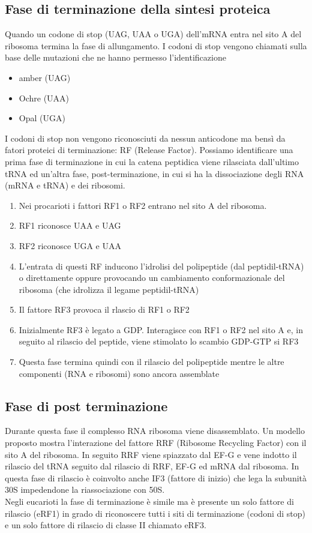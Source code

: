 \documentclass{article}
\begin{document}
\subsection{Fase di terminazione della sintesi proteica}
Quando un codone di stop (UAG, UAA o UGA) dell'mRNA entra nel sito A del ribosoma termina la fase di allungamento.
I codoni di stop vengono chiamati sulla base delle mutazioni che ne hanno permesso l'identificazione
\begin{itemize}
    \item amber (UAG)
    \item Ochre (UAA)
    \item Opal (UGA)
\end{itemize}
I codoni di stop non vengono riconosciuti da nessun anticodone ma bensì da fatori proteici di terminazione: RF (Release Factor).
Possiamo identificare una prima fase di terminazione in cui la catena peptidica viene rilasciata dall'ultimo tRNA ed
un'altra fase, post-terminazione, in cui si ha la dissociazione degli RNA (mRNA e tRNA) e dei ribosomi.
\begin{enumerate}
    \item Nei procarioti i fattori RF1 o RF2 entrano nel sito A del
    ribosoma.
    \item RF1 riconosce UAA e UAG
    \item RF2 riconosce UGA e UAA
    \item L'entrata di questi RF inducono l'idrolisi del polipeptide (dal
    peptidil-tRNA) o direttamente oppure provocando un
    cambiamento conformazionale del ribosoma (che idrolizza
    il legame peptidil-tRNA)
    \item Il fattore RF3 provoca il rlascio di RF1 o RF2
    \item Inizialmente RF3 è legato a GDP. Interagisce con RF1 o RF2 nel sito A e, in seguito al
    rilascio del peptide, viene stimolato lo scambio
    GDP-GTP si RF3
    \item Questa fase termina quindi con il rilascio del polipeptide
    mentre le altre componenti (RNA e ribosomi) sono ancora
    assemblate
\end{enumerate}
\subsection{Fase di post terminazione}
Durante questa fase il complesso RNA ribosoma viene disassemblato. Un modello proposto mostra l'interazione del fattore RRF
(Ribosome Recycling Factor) con il sito A del ribosoma. In seguito RRF viene spiazzato dal EF-G e vene indotto il rilascio del tRNA
seguito dal rilascio di RRF, EF-G ed mRNA dal ribosoma. In questa fase di rilascio è coinvolto anche IF3 (fattore di inizio) che lega la subunità 30S impedendone la riassociazione con 50S.\\
Negli eucarioti la fase di terminazione è simile ma è presente un solo fattore di rilascio (eRF1) in grado di riconoscere tutti i siti di terminazione (codoni di stop) e
un solo fattore di rilascio di classe II chiamato eRF3.
\end{document}
